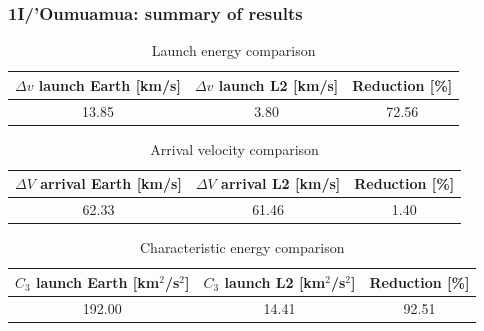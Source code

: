 \documentclass[xcolor={dvipsnames}]{beamer}
\begin{document}
\begin{frame}
\frametitle{1I/'Oumuamua: summary of results}

\begin{table}[H]
  \centering
  \begin{tabular}{|c|c|c|}
    \hline
    $\Delta v$ launch Earth [km/s] & $\Delta v$ launch L2 [km/s] & Reduction [\%] \\
    \hline
    13.85                          & 3.80                        & 72.56          \\
    \hline
  \end{tabular}
  \caption{Launch energy comparison}
  \label{tab:oumuamua-summary-results-v-launch}
\end{table}

\begin{table}[H]
  \centering
  \begin{tabular}{|c|c|c|}
    \hline
    $\Delta V$ arrival Earth [km/s] & $\Delta V$ arrival L2 [km/s] & Reduction [\%] \\
    \hline
    62.33                           & 61.46                        & 1.40           \\
    \hline
  \end{tabular}
  \caption{Arrival velocity comparison}
  \label{tab:oumuamua-summary-results-arrival-v}
\end{table}

\begin{table}[H]
  \centering
  \begin{tabular}{|c|c|c|}
    \hline
    $C_3$ launch Earth [km$^2$/s$^2$] & $C_3$ launch L2 [km$^2$/s$^2$] & Reduction [\%] \\
    \hline
    192.00                            & 14.41                          & 92.51          \\
    \hline
  \end{tabular}
  \caption{Characteristic energy comparison}
  \label{tab:oumuamua-summary-results-c3-launch}
\end{table}

\end{frame}
\end{document}
